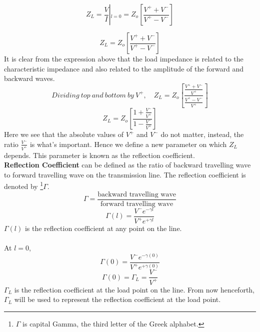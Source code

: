 \begin{equation*}
Z_{L} = \frac{V}{I}\left|_{l = 0} = Z_{o} \left[ \frac{V^+ + V^-}{V^+ - V^-} \right]\right.    
\end{equation*}

\begin{equation}
Z_L = Z_o \left[ \frac{V^+ + V^-}{V^+ - V^-} \right]
\end{equation}
It is clear from the expression above that the load impedance is related to the characteristic impedance and also related to the amplitude of the forward and backward waves. 
\begin{equation*}
Dividing\ top\ and\ bottom\ by\ V^+,\quad
Z_L = Z_o\left[ \frac{\frac{V^+ + V^-}{V^+}}{\frac{V^+ - V^-}{V^+}}\right] 
\end{equation*}
\begin{equation}
Z_L = Z_o\left[ \frac{1+ \frac{V^-}{V^+}}{1 - \frac{V^-}{V^+}}\right] 
\label{eqn:impedatload}
\end{equation}
Here we see that the absolute values of $V^+$ and $V^-$ do not matter, instead, the ratio $\frac{V^-}{V^+}$ is what's important. Hence we define a new parameter on which $Z_L$ depends. This parameter is known as the reflection coefficient.\\ \textbf{Reflection Coefficient} can be defined as the ratio of backward travelling wave to forward travelling wave on the transmission line.
The reflection coefficient is denoted by \footnote[3]{$\Gamma$ is capital Gamma, the third letter of the Greek alphabet.}$\Gamma$.
\begin{equation*}
\Gamma = \frac{\text{backward travelling wave}}{\text{forward travelling wave}}
\end{equation*}
\begin{equation}
\Gamma (l) = \frac{V^-e^{-\gamma l}}{V^+e^{+\gamma l}}
\label{eqn:rfc}
\end{equation}
 $\Gamma(l)$ is the reflection coefficient at any point on the line.\\ \\
At $l = 0$,
\begin{equation*}
\Gamma (0) = \frac{V^-e^{-\gamma (0)}}{V^+e^{+\gamma (0)}}
\end{equation*}
\begin{equation}
\Gamma (0) = \Gamma_L = \frac{V^-}{V^+}
\label{eqn:rfcatload}
\end{equation}
$\Gamma_L$ is the reflection coefficient at the load point on the line. From now henceforth, $\Gamma_L$ will be used to represent the reflection coefficient at the load point.\\
